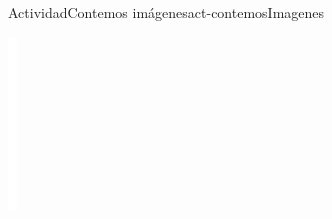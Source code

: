 \documentclass[20pt]{extarticle}
\begin{document}
\begin{activity}{Actividad}{Contemos imágenes}{act-contemosImagenes}
\begin{image}{0}{1}{0}{}
\includegraphics[max width=\linewidth, center]{external/whitespace-tikz/3cm.pdf}

\end{image}
\end{activity}
\end{document}
